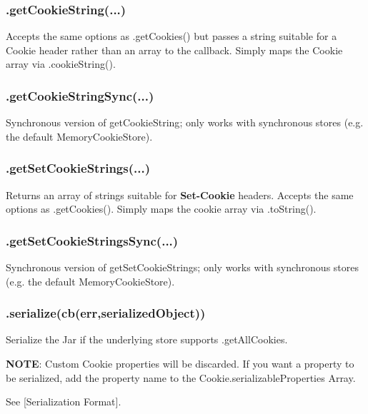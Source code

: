 \subsubsection*{{\ttfamily .get\+Cookie\+String(...)}}

Accepts the same options as {\ttfamily .get\+Cookies()} but passes a string suitable for a Cookie header rather than an array to the callback. Simply maps the {\ttfamily Cookie} array via {\ttfamily .cookie\+String()}.

\subsubsection*{{\ttfamily .get\+Cookie\+String\+Sync(...)}}

Synchronous version of {\ttfamily get\+Cookie\+String}; only works with synchronous stores (e.\+g. the default {\ttfamily Memory\+Cookie\+Store}).

\subsubsection*{{\ttfamily .get\+Set\+Cookie\+Strings(...)}}

Returns an array of strings suitable for {\bfseries Set-\/\+Cookie} headers. Accepts the same options as {\ttfamily .get\+Cookies()}. Simply maps the cookie array via {\ttfamily .to\+String()}.

\subsubsection*{{\ttfamily .get\+Set\+Cookie\+Strings\+Sync(...)}}

Synchronous version of {\ttfamily get\+Set\+Cookie\+Strings}; only works with synchronous stores (e.\+g. the default {\ttfamily Memory\+Cookie\+Store}).

\subsubsection*{{\ttfamily .serialize(cb(err,serialized\+Object))}}

Serialize the Jar if the underlying store supports {\ttfamily .get\+All\+Cookies}.

{\bfseries N\+O\+T\+E}\+: Custom {\ttfamily Cookie} properties will be discarded. If you want a property to be serialized, add the property name to the {\ttfamily Cookie.\+serializable\+Properties} Array.

See \mbox{[}Serialization Format\mbox{]}.

